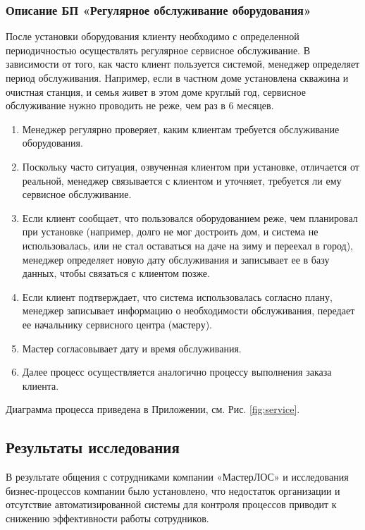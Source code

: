 \documentclass[a4paper,12pt]{article}
\begin{document}
\subsubsection{Описание БП «Регулярное обслуживание оборудования»}

После установки оборудования клиенту необходимо с определенной периодичностью осуществлять регулярное сервисное обслуживание. В зависимости от того, как часто клиент пользуется системой, менеджер определяет период обслуживания. Например, если в частном доме установлена скважина и очистная станция, и семья живет в этом доме круглый год, сервисное обслуживание нужно проводить не реже, чем раз в 6 месяцев.

\begin{enumerate}
    \item Менеджер регулярно проверяет, каким клиентам требуется обслуживание оборудования.
    \item Поскольку часто ситуация, озвученная клиентом при установке, отличается от реальной, менеджер связывается с клиентом и уточняет, требуется ли ему сервисное обслуживание.
    \item Если клиент сообщает, что пользовался оборудованием реже, чем планировал при установке (например, долго не мог достроить дом, и система не использовалась, или не стал оставаться на даче на зиму и переехал в город), менеджер определяет новую дату обслуживания и записывает ее в базу данных, чтобы связаться с клиентом позже.
    \item Если клиент подтверждает, что система использовалась согласно плану, менеджер записывает информацию о необходимости обслуживания, передает ее начальнику сервисного центра (мастеру).
    \item Мастер согласовывает дату и время обслуживания.
    \item Далее процесс осуществляется аналогично процессу выполнения заказа клиента.
\end{enumerate}

Диаграмма процесса приведена в Приложении, см. Рис. \ref{fig:service}.

\subsection{Результаты исследования}

В результате общения с сотрудниками компании «МастерЛОС» и исследования бизнес-процессов компании было установлено, что недостаток организации и отсутствие автоматизированной системы для контроля процессов приводит к снижению эффективности работы сотрудников.
\end{document}
